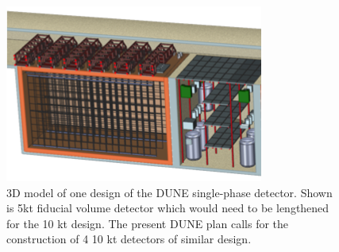 \begin{figure}[!htb]
\centering
\begin{minipage}[b]{1.0\textwidth}
\begin{center}
\includegraphics[width=.75\textwidth]{./figures/fardet-3D.png}
\end{center}
\end{minipage}
\caption{\small 3D model of one design of the DUNE single-phase detector. Shown is 5kt fiducial volume detector which would need to be lengthened for the 10 kt design. The present DUNE plan calls for the construction of 4 10 kt detectors of similar design. }
\label{fig:fardet-overview} 
\end{figure}

